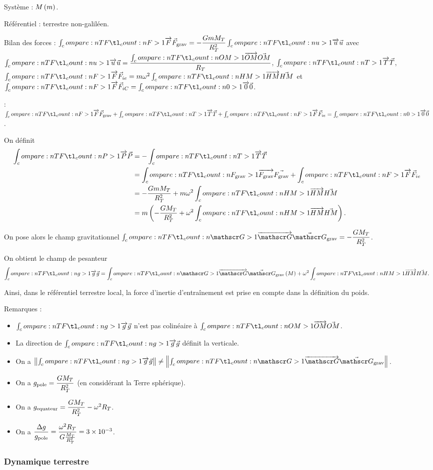 Système : \(M\left(m\right)\).

Référentiel : terrestre non-galiléen.

Bilan des forces : \(\v{F}_\grav=-\dfrac{GmM_T}{R_T^2}\v{u}\) avec \(\v{u}=\dfrac{\v{OM}}{R_T}\), \(\v{T}\), \(\v{F}_{ie}=m\omega^2\v{HM}\) et \(\v{F}_{iC}=\v{0}\).

\PFD : \(\v{F}_\grav+\v{T}+\v{F}_{ie}=\v{0}\).

On définit \[\begin{aligned}
\v{P}&=-\v{T} \\
&=\v{F_\grav}+\v{F}_{ie} \\
&=-\dfrac{GmM_T}{R_T^2}+m\omega^2\v{HM} \\
&=m\paren{-\dfrac{GM_T}{R_T^2}+\omega^2\v{HM}}.
\end{aligned}\]

On pose alors le champ gravitationnel \(\v{\call{G}}_\grav=-\dfrac{GM_T}{R_T^2}\).

On obtient le champ de pesanteur \[\v{g}=\v{\call{G}}_\grav\paren{M}+\omega^2\v{HM}.\]

Ainsi, dans le référentiel terrestre local, la force d'inertie d'entraînement est prise en compte dans la définition du poids.

Remarques :

\begin{itemize}
    \item \(\v{g}\) n'est pas colinéaire à \(\v{OM}\). \\
    \item La direction de \(\v{g}\) définit la verticale. \\
    \item On a \(\norme{\v{g}}\not=\norme{\v{\call{G}}_\grav}\). \\
    \item On a \(g_{\mathrm{pole}}=\dfrac{GM_T}{R_T^2}\) (en considérant la Terre sphérique). \\
    \item On a \(g_{\mathrm{equateur}}=\dfrac{GM_T}{R_T^2}-\omega^2R_T\). \\
    \item On a \(\dfrac{\adif{g}}{g_\pole}=\dfrac{\omega^2R_T}{G\frac{M_T}{R_T^2}}=\num{3e-3}\).
\end{itemize}

\subsubsection{Dynamique terrestre}

